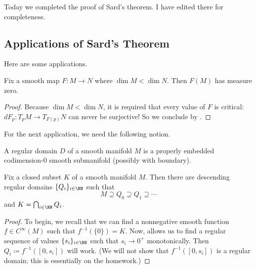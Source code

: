\documentclass[../notes.tex]{subfiles}
\begin{document}
Today we completed the proof of Sard's theorem. I have edited there for completeness.

\subsection{Applications of Sard's Theorem}
Here are some applications.
\begin{corollary} \label{cor:image-null-set}
	Fix a smooth map $F\colon M\to N$ where $\dim M<\dim N$. Then $F(M)$ has measure zero.
\end{corollary}
\begin{proof}
	Because $\dim M<\dim N$, it is required that every value of $F$ is critical: $dF_p\colon T_pM\to T_{F(p)}N$ can never be surjective! So we conclude by . 
\end{proof}
For the next application, we need the following notion.
\begin{definition}
	A regular domain $D$ of a smooth manifold $M$ is a properly embedded codimension-$0$ smooth submanifold (possibly with boundary).
\end{definition}
\begin{corollary}
	Fix a closed subset $K$ of a smooth manifold $M$. Then there are descending regular domains $\{Q_i\}_{i\in\NN}$ such that
	\[M\supseteq Q_0\supseteq Q_1\supseteq\cdots\]
	and $K=\bigcap_{i\in\NN}Q_i$.
\end{corollary}
\begin{proof}
	To begin, we recall that we can find a nonnegative smooth function $f\in C^\infty(M)$ such that $f^{-1}(\{0\})=K$. Now,  allows us to find a regular sequence of values $\{s_i\}_{i\in\NN}$ such that $s_i\to0^+$ monotonically. Then $Q_i\coloneqq f^{-1}([0,s_i])$ will work. (We will not show that $f^{-1}([0,s_i])$ is a regular domain; this is essentially on the homework.)
\end{proof}
\end{document}
